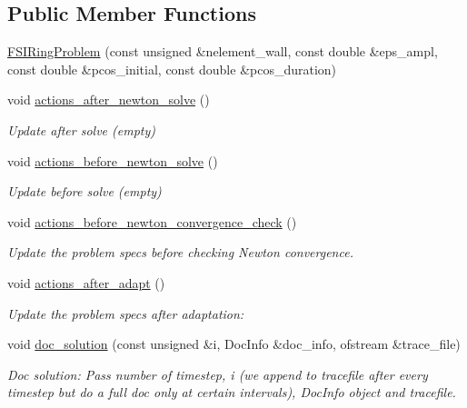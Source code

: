\subsection*{Public Member Functions}
\begin{DoxyCompactItemize}
\item 
\hyperlink{classFSIRingProblem_a8f4969c6397bebe8afa2b9285ec908e6}{F\+S\+I\+Ring\+Problem} (const unsigned \&nelement\+\_\+wall, const double \&eps\+\_\+ampl, const double \&pcos\+\_\+initial, const double \&pcos\+\_\+duration)
\item 
void \hyperlink{classFSIRingProblem_a63a3da079b167ccdc288372bee6bdbc3}{actions\+\_\+after\+\_\+newton\+\_\+solve} ()
\begin{DoxyCompactList}\small\item\em Update after solve (empty) \end{DoxyCompactList}\item 
void \hyperlink{classFSIRingProblem_a9fd26120e4e078bca685a5c94482ee12}{actions\+\_\+before\+\_\+newton\+\_\+solve} ()
\begin{DoxyCompactList}\small\item\em Update before solve (empty) \end{DoxyCompactList}\item 
void \hyperlink{classFSIRingProblem_afaf315a9b0feb319cf66b21f959e465e}{actions\+\_\+before\+\_\+newton\+\_\+convergence\+\_\+check} ()
\begin{DoxyCompactList}\small\item\em Update the problem specs before checking Newton convergence. \end{DoxyCompactList}\item 
void \hyperlink{classFSIRingProblem_af4ffa3d628230ef064a84b7c6e6a5fb8}{actions\+\_\+after\+\_\+adapt} ()
\begin{DoxyCompactList}\small\item\em Update the problem specs after adaptation\+: \end{DoxyCompactList}\item 
void \hyperlink{classFSIRingProblem_a686782b9af582b68e55c288e1fe4660e}{doc\+\_\+solution} (const unsigned \&i, Doc\+Info \&doc\+\_\+info, ofstream \&trace\+\_\+file)
\begin{DoxyCompactList}\small\item\em Doc solution\+: Pass number of timestep, i (we append to tracefile after every timestep but do a full doc only at certain intervals), Doc\+Info object and tracefile. \end{DoxyCompactList}\item 

\end{DoxyCompactItemize}
